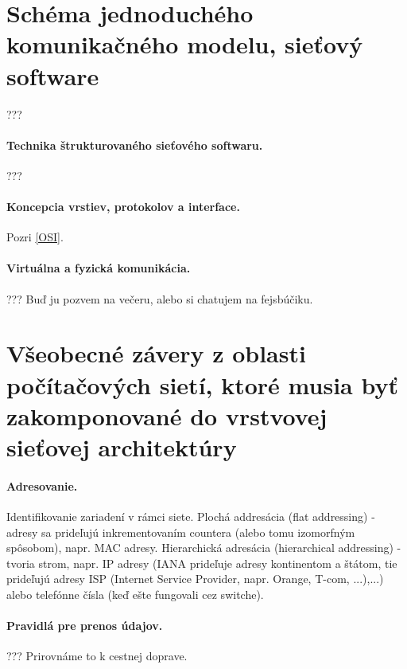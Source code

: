 \section{Schéma jednoduchého komunikačného modelu, sieťový software} 
???

\paragraph{Technika štrukturovaného sieťového softwaru.} 
???
  
\paragraph{Koncepcia vrstiev, protokolov a interface.} 
Pozri \ref{OSI}. 

\paragraph{Virtuálna a fyzická komunikácia.}      
???
Buď ju pozvem na večeru, alebo si chatujem na fejsbúčiku. 
                            
\section{Všeobecné závery z oblasti počítačových sietí, ktoré musia byť zakomponované do vrstvovej sieťovej architektúry}   
\paragraph{Adresovanie.}    
Identifikovanie zariadení v rámci siete. Plochá addresácia (flat addressing) - adresy sa prideľujú inkrementovaním countera (alebo tomu izomorfným spôsobom), napr. MAC adresy.
Hierarchická adresácia (hierarchical addressing) - tvoria strom, napr. IP adresy (IANA prideľuje adresy kontinentom a štátom, tie prideľujú adresy ISP (Internet Service Provider, napr. Orange, T-com, ...),...) alebo telefónne čísla (keď ešte fungovali cez switche).
              
\paragraph{Pravidlá pre prenos údajov.}   
???
Prirovnáme to k cestnej doprave. 

